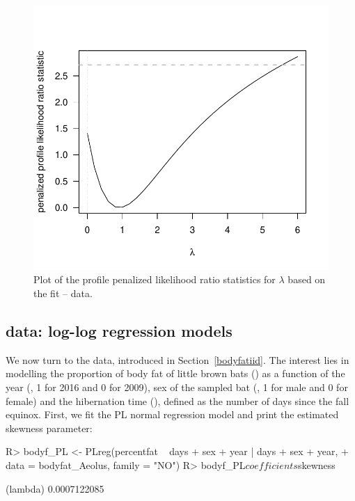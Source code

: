 \begin{figure}[t]
\centering
\includegraphics[scale=0.6]{figures/Fig6-1.pdf}
\caption{\label{fig:Fig6-1} Plot of the profile penalized likelihood ratio statistics for $\lambda$ based on the  fit --  data.}
\end{figure}

\subsection[R code]{ data: log-log regression models}


We now turn to the  data, introduced in Section~\ref{bodyfatiid}. The interest lies in modelling the proportion of body fat of little brown bats () as a function of the year
(, 1 for 2016 and 0 for 2009), sex of the sampled bat (, 1 for male and 0 for female) and the hibernation time (), defined as the number of days since the fall equinox. First, we fit the PL normal regression model and print the estimated skewness parameter:
%
\begin{Schunk}
\begin{Sinput}
R> bodyf_PL <- PLreg(percentfat ~ days + sex + year | days + sex + year,
+                    data = bodyfat_Aeolus, family = "NO")
R> bodyf_PL$coefficients$skewness
\end{Sinput}
\begin{Soutput}
    (lambda) 
0.0007122085 
\end{Soutput}
\end{Schunk}

